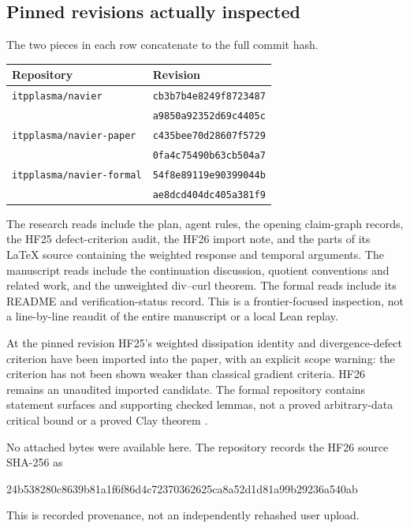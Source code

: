 \documentclass[11pt,a4paper]{article}
\theoremstyle{definition}\newtheorem{definition}[theorem]{Definition}
\theoremstyle{remark}\newtheorem{remark}[theorem]{Remark}
\newcommand{\repo}[1]{{\small\texttt{#1}}}
\numberwithin{equation}{section}
\begin{document}
\subsection{Pinned revisions actually inspected}
The two pieces in each row concatenate to the full commit hash.
\begin{center}
\begin{tabular}{@{}lp{101mm}@{}}\toprule
Repository & Revision\\\midrule
\repo{itpplasma/navier} & \repo{cb3b7b4e8249f8723487}\\[-2pt]
 & \repo{a9850a92352d69c4405c}\\
\repo{itpplasma/navier-paper} & \repo{c435bee70d28607f5729}\\[-2pt]
 & \repo{0fa4c75490b63cb504a7}\\
\repo{itpplasma/navier-formal} & \repo{54f8e89119e90399044b}\\[-2pt]
 & \repo{ae8dcd404dc405a381f9}\\\bottomrule
\end{tabular}
\end{center}
The research reads include the plan, agent rules, the opening claim-graph records, the HF25 defect-criterion audit, the HF26 import note, and the parts of its LaTeX source containing the weighted response and temporal arguments. The manuscript reads include the continuation discussion, quotient conventions and related work, and the unweighted div--curl theorem. The formal reads include its README and verification-status record. This is a frontier-focused inspection, not a line-by-line reaudit of the entire manuscript or a local Lean replay.

At the pinned revision HF25's weighted dissipation identity and divergence-defect criterion have been imported into the paper, with an explicit scope warning: the criterion has not been shown weaker than classical gradient criteria. HF26 remains an unaudited imported candidate. The formal repository contains statement surfaces and supporting checked lemmas, not a proved arbitrary-data critical bound or a proved Clay theorem \cite{Research,Audit,HF26,Formal}.

No attached bytes were available here. The repository records the HF26 source SHA-256 as
\begin{center}\small\ttfamily
24b538280c8639b81a1f6f86d4c72370362625ca8a52d1d81a99b29236a540ab
\end{center}
This is recorded provenance, not an independently rehashed user upload.
\end{document}
